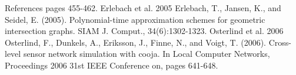\documentclass[final,hyperref={pdfpagelabels=false}]{beamer}
\begin{document}
\begin{frame}{}
\begin{block}{\footnotesize References}
        pages 455-462.\newline
      {\normalsize Erlebach et al. 2005} Erlebach, T., Jansen, K., and Seidel, E. (2005). 
        Polynomial-time approximation schemes for geometric intersection graphs. SIAM J. 
        Comput., 34(6):1302-1323. \newline
      {\normalsize Osterlind et al. 2006}  Osterlind, F., Dunkels, A., Eriksson, J., Finne, 
        N., and Voigt, T. (2006). Cross-level sensor network simulation with cooja. In Local 
        Computer Networks, Proceedings 2006 31st IEEE Conference on, pages 641-648.
    \end{block}    
  \end{frame}
\end{document}
